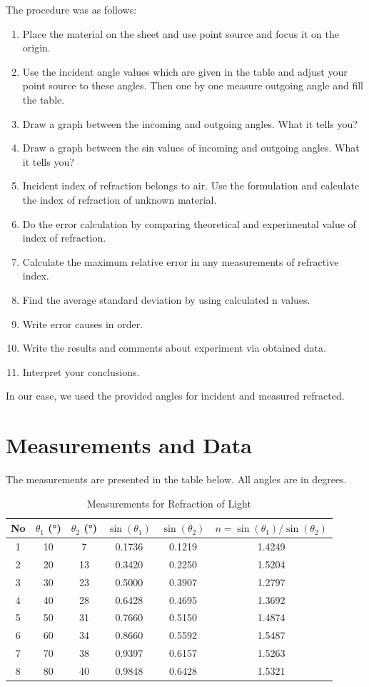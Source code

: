 \documentclass[12pt, a4paper]{article}
\begin{document}
The procedure was as follows:
\begin{enumerate}
\item Place the material on the sheet and use point source and focus it on the origin.
\item Use the incident angle values which are given in the table and adjust your point source to these angles. Then one by one measure outgoing angle and fill the table.
\item Draw a graph between the incoming and outgoing angles. What it tells you?
\item Draw a graph between the sin values of incoming and outgoing angles. What it tells you?
\item Incident index of refraction belongs to air. Use the formulation and calculate the index of refraction of unknown material.
\item Do the error calculation by comparing theoretical and experimental value of index of refraction.
\item Calculate the maximum relative error in any measurements of refractive index.
\item Find the average standard deviation by using calculated n values.
\item Write error causes in order.
\item Write the results and comments about experiment via obtained data.
\item Interpret your conclusions.
\end{enumerate}

In our case, we used the provided angles for incident and measured refracted.

\section{Measurements and Data}
The measurements are presented in the table below. All angles are in degrees.

\begin{small}
	\begin{longtable}{|c|c|c|c|c|c|}
		\caption{Measurements for Refraction of Light} \label{tab:measurements} \\
		\hline
        \textbf{No} & \textbf{$\theta_1$ (°)} & \textbf{$\theta_2$ (°)} & \textbf{$\sin(\theta_1)$} & \textbf{$\sin(\theta_2)$} & \textbf{$n = \sin(\theta_1)/\sin(\theta_2)$} \\
		\hline
		1 & 10 & 7 & 0.1736 & 0.1219 & 1.4249 \\
		2 & 20 & 13 & 0.3420 & 0.2250 & 1.5204 \\
		3 & 30 & 23 & 0.5000 & 0.3907 & 1.2797 \\
		4 & 40 & 28 & 0.6428 & 0.4695 & 1.3692 \\
		5 & 50 & 31 & 0.7660 & 0.5150 & 1.4874 \\
		6 & 60 & 34 & 0.8660 & 0.5592 & 1.5487 \\
		7 & 70 & 38 & 0.9397 & 0.6157 & 1.5263 \\
		8 & 80 & 40 & 0.9848 & 0.6428 & 1.5321 \\
		\hline
	\end{longtable}
\end{small}
\end{document}
